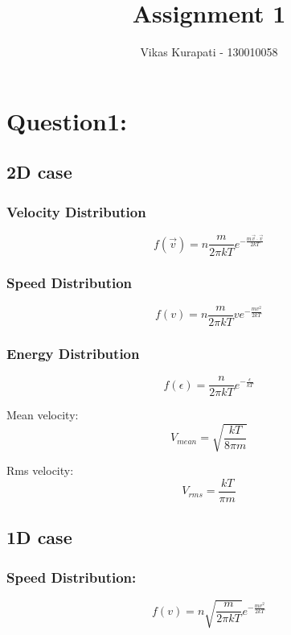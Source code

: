 \documentclass[11pt, a4paper]{article}
\title{\textbf{Assignment 1}}
\author{Vikas Kurapati - 130010058}
\begin{document}
\maketitle
\newpage
\section{Question1:}
\subsection{2D case}
\subsubsection{Velocity Distribution}
\begin{equation}
 f(\vec{v}) = n\frac{m}{2\pi k T}e^{-\frac{m\vec{v}\cdot\vec{v}}{2kT}}
\end{equation}
\subsubsection{Speed Distribution}
\begin{equation}
 f(v) = n \frac{m}{2\pi k T}ve^{-\frac{mv^2}{2kT}}
\end{equation}

\subsubsection{Energy Distribution}
\begin{equation}
 f(\epsilon) = \frac{n}{2\pi kT}e^{-\frac{\epsilon}{kT}}
\end{equation}

Mean velocity:
\begin{equation}
 V_{mean} = \sqrt{\frac{kT}{8\pi m}}
\end{equation}

Rms velocity:
\begin{equation}
 V_{rms} = \frac{kT}{\pi m}
\end{equation}


\subsection{1D case}
\subsubsection{Speed Distribution:}
\begin{equation}
 f(v) = n\sqrt{\frac{m}{2\pi kT}}e^{-\frac{mv^2}{2kT}}
\end{equation}
\end{document}

